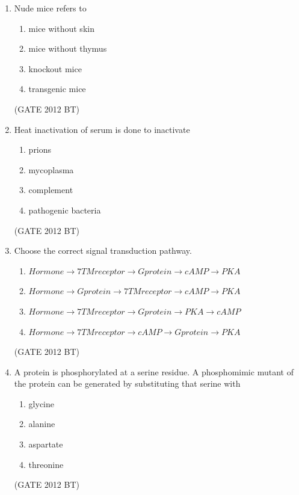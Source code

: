 \documentclass[journal,12pt,onecolumn]{IEEEtran}
\theoremstyle{remark}
\begin{document}
\begin{enumerate}
\item 	Nude mice refers to
\begin{multicols}{4}
\begin{enumerate}
\item mice without skin	
\item mice without thymus
\item knockout mice
\item transgenic mice
\end{enumerate}
\end{multicols} \hfill(GATE 2012 BT)

\item 	Heat inactivation of serum is done to inactivate
\begin{multicols}{4}
\begin{enumerate}
\item prions	
\item mycoplasma 
\item complement	
\item pathogenic bacteria
\end{enumerate}
\end{multicols} \hfill(GATE 2012 BT)


\item Choose the correct signal transduction pathway.

\begin{enumerate}
\item$ Hormone \rightarrow 7 TM receptor\rightarrow G protein \rightarrow cAMP \rightarrow PKA$
\item $Hormone \rightarrow G protein \rightarrow 7 TM receptor \rightarrow cAMP \rightarrow PKA$
\item $Hormone \rightarrow 7 TM receptor \rightarrow G protein \rightarrow PKA \rightarrow cAMP$
\item $Hormone \rightarrow 7 TM receptor \rightarrow cAMP \rightarrow G protein \rightarrow PKA$
\end{enumerate} \hfill(GATE 2012 BT)



\item 	A protein is phosphorylated at a serine residue. A phosphomimic mutant of the protein can be generated by substituting that serine with
\begin{multicols}{4}
\begin{enumerate}
\item  glycine	
\item  alanine	
\item  aspartate	
\item  threonine
\end{enumerate}
\end{multicols} \hfill(GATE 2012 BT)


\end{enumerate}
\end{document}
